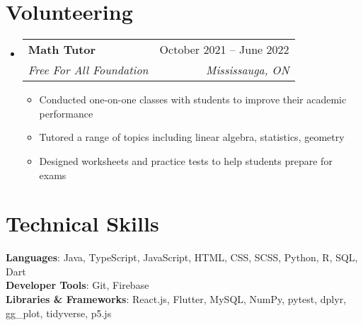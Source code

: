 \documentclass[letterpaper,11pt]{article}
\makeatletter
\newcommand{\resumeItem}[1]{
  \item\small{
    {#1 \vspace{-2pt}}
  }
}
\newcommand{\resumeSubheading}[4]{
  \vspace{-2pt}\item
    \begin{tabular*}{0.97\textwidth}[t]{l@{\extracolsep{\fill}}r}
      \textbf{#1} & #2 \\
      \textit{\small#3} & \textit{\small #4} \\
    \end{tabular*}\vspace{-7pt}
}
\newcommand{\resumeSubSubheading}[2]{
    \item
    \begin{tabular*}{0.97\textwidth}{l@{\extracolsep{\fill}}r}
      \textit{\small#1} & \textit{\small #2} \\
    \end{tabular*}\vspace{-7pt}
}
\newcommand{\resumeSubHeadingListStart}{\begin{itemize}[leftmargin=0.15in, label={}]}
\newcommand{\resumeSubHeadingListEnd}{\end{itemize}}
\newcommand{\resumeItemListStart}{\begin{itemize}}
\newcommand{\resumeItemListEnd}{\end{itemize}\vspace{-5pt}}
\makeatother
\begin{document}
    
    
\section{Volunteering}
  \resumeSubHeadingListStart

    \resumeSubheading
      {Math Tutor}{October 2021 -- June 2022}
      {Free For All Foundation}{Mississauga, ON}
      \resumeItemListStart
        \resumeItem{Conducted one-on-one classes with students to improve their academic performance}
        \resumeItem{Tutored a range of topics including linear algebra, statistics, geometry}
        \resumeItem{Designed worksheets and practice tests to help students prepare for exams}

      \resumeItemListEnd
      

  \resumeSubHeadingListEnd




%
\section{Technical Skills}
 \begin{itemize}[leftmargin=0.15in, label={}]
    \small{\item{
     \textbf{Languages}{: Java, TypeScript, JavaScript, HTML, CSS, SCSS, Python, R, SQL, Dart} \\
     \textbf{Developer Tools}{: Git, Firebase} \\
     \textbf{Libraries \& Frameworks}{: React.js, Flutter, MySQL, NumPy, pytest, dplyr, gg\_plot, tidyverse, p5.js}
    }}
 \end{itemize}


\end{document}

